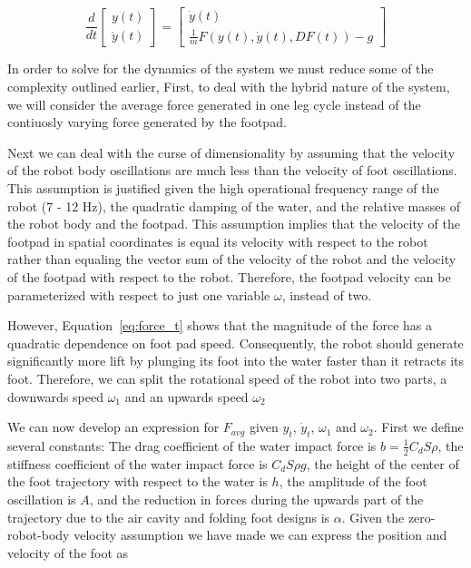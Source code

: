 \begin{equation}
	\frac{d}{dt} \begin{bmatrix} y(t) \\ \dot{y}(t) \end{bmatrix} = \begin{bmatrix} \dot{y}(t) \\ \frac{1}{m} F(y(t),\dot{y}(t), DF(t)) - g \end{bmatrix} 
    \label{eq:eom}
\end{equation}

In order to solve for the dynamics of the system we must reduce some of the complexity outlined earlier, First, to deal with the hybrid nature of the system, we will consider the average force generated in one leg cycle instead of the contiuosly varying force generated by the footpad. 

Next we can deal with the curse of dimensionality by assuming that the velocity of the robot body oscillations are much less than the velocity of foot oscillations. This assumption is justified given the high operational frequency range of the robot (7 - 12 Hz), the quadratic damping of the water, and the relative masses of the robot body and the footpad. This assumption implies that the velocity of the footpad in spatial coordinates is equal its velocity with respect to the robot rather than equaling the vector sum of the velocity of the robot and the velocity of the footpad with respect to the robot. Therefore, the footpad velocity can be parameterized with respect to just one variable $\omega$, instead of two.

However, Equation~\ref{eq:force_t} shows that the magnitude of the force has a quadratic dependence on foot pad speed. Consequently, the robot should generate significantly more lift by plunging its foot into the water faster than it retracts its foot. Therefore, we can split the rotational speed of the robot into two parts, a downwards speed $\omega_1$ and an upwards speed $\omega_2$

We can now develop an expression for $F_{avg}$ given $y_t$, $\dot{y}_t$, $\omega_1$ and $\omega_2$. First we define several constants: The drag coefficient of the water impact force is $b = \frac{1}{2} C_d S \rho$, the stiffness coefficient of the water impact force is $C_d S \rho g$, the height of the center of the foot trajectory with respect to the water is $h$, the amplitude of the foot oscillation is $A$, and the reduction in forces during the upwards part of the trajectory due to the air cavity and folding foot designs is $\alpha$. Given the zero-robot-body velocity assumption we have made we can express the position and velocity of the foot as


